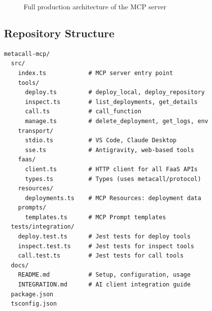 \documentclass[12pt, a4paper]{article}
\begin{document}
\begin{figure}[H]
\caption{Full production architecture of the MCP server}
\end{figure}

\newpage
\subsection{Repository Structure}

\begin{lstlisting}[language={}, numbers=none, frame=none,
  backgroundcolor=\color{mcgray},
  basicstyle=\ttfamily\small,
  caption={Proposed final project structure}]
metacall-mcp/
  src/
    index.ts            # MCP server entry point
    tools/
      deploy.ts         # deploy_local, deploy_repository
      inspect.ts        # list_deployments, get_details
      call.ts           # call_function
      manage.ts         # delete_deployment, get_logs, env
    transport/
      stdio.ts          # VS Code, Claude Desktop
      sse.ts            # Antigravity, web-based tools
    faas/
      client.ts         # HTTP client for all FaaS APIs
      types.ts          # Types (uses metacall/protocol)
    resources/
      deployments.ts    # MCP Resources: deployment data
    prompts/
      templates.ts      # MCP Prompt templates
  tests/integration/
    deploy.test.ts      # Jest tests for deploy tools
    inspect.test.ts     # Jest tests for inspect tools
    call.test.ts        # Jest tests for call tools
  docs/
    README.md           # Setup, configuration, usage
    INTEGRATION.md      # AI client integration guide
  package.json
  tsconfig.json
\end{lstlisting}
\end{document}
